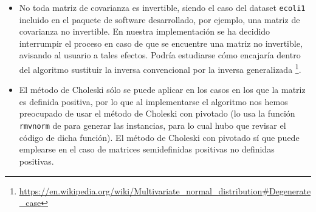 \begin{itemize} 
 \item No toda matriz de covarianza es invertible, siendo el caso del dataset \texttt{ecoli1} incluido en el paquete de software 
 desarrollado, por ejemplo, una matriz de covarianza no invertible. En nuestra implementación se ha decidido interrumpir
 el proceso en caso de que se encuentre una matriz no invertible, avisando al usuario a tales efectos. Podría estudiarse cómo encajaría
 dentro del algoritmo sustituir la inversa convencional por la inversa generalizada 
 \footnote{\url{https://en.wikipedia.org/wiki/Multivariate_normal_distribution\#Degenerate_case}}.

 \item El método de Choleski sólo se puede aplicar en los casos en los que la matriz es definida positiva, por lo que 
 al implementarse el algoritmo nos hemos preocupado de usar el método de Choleski con pivotado (lo usa la función \texttt{rmvnorm}
 de  para generar las instancias, para lo cual hubo que revisar el código de dicha función). El método
 de Choleski con pivotado sí que puede emplearse en el caso de matrices semidefinidas positivas no definidas positivas.
\end{itemize}

